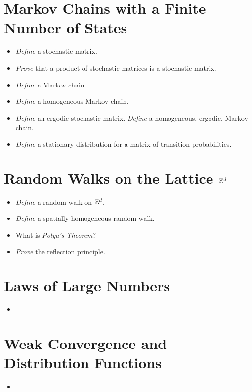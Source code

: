 \documentclass{article}
\newcommand{\cold}{{\color{babyblue}{\Snowflake}}}
\newcommand{\prac}{{\color{arsenic}{\ding{43}}}}
\newcommand{\know}{{\color{arylideyellow}{\Lightning}}}
\begin{document}
\section{Markov Chains with a Finite Number of States}
\begin{itemize}[nosep]
    \item[\cold] \textit{Define} a stochastic matrix. 
    \item[\cold] \textit{Prove} that a product of stochastic matrices is a stochastic matrix. 
    \item[\cold] \textit{Define} a Markov chain.
    \item[\cold] \textit{Define} a homogeneous Markov chain.
    \item[\cold] \textit{Define} an ergodic stochastic matrix. \textit{Define} a homogeneous, ergodic, Markov chain.
    \item[\cold] \textit{Define} a stationary distribution for a matrix of transition probabilities. 
\end{itemize}

\section{Random Walks on the Lattice $\mathbb{Z}^d$}
\begin{itemize}[nosep]
    \item[\cold] \textit{Define} a random walk on $\mathbb{Z}^d$. 
    \item[\cold] \textit{Define} a spatially homogeneous random walk.
    \item[\know] What is \textit{Polya's Theorem}?
    \item[\prac] \textit{Prove} the reflection principle.
\end{itemize}

\section{Laws of Large Numbers}
\begin{itemize}[nosep]
    \item 
\end{itemize}

\section{Weak Convergence and Distribution Functions}
\begin{itemize}
    \item 
\end{itemize}
\end{document}
